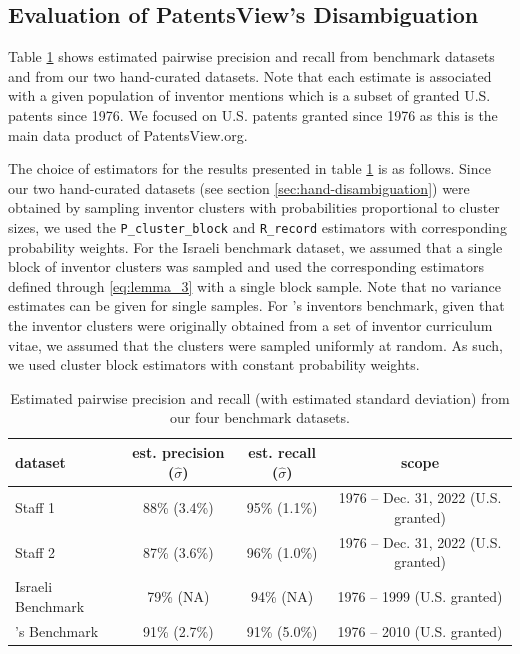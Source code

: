 \documentclass[fontsize=11pt]{article}
\theoremstyle{definition}
\begin{document}
\subsection{Evaluation of PatentsView's Disambiguation}

Table \ref{tab:results} shows estimated pairwise precision and recall from benchmark datasets and from our two hand-curated datasets. Note that each estimate is associated with a given population of inventor mentions which is a subset of granted U.S. patents since 1976. We focused on U.S. patents granted since 1976 as this is the main data product of PatentsView.org.

The choice of estimators for the results presented in table \ref{tab:results} is as follows.
Since our two hand-curated datasets (see section \ref{sec:hand-disambiguation}) were obtained by sampling inventor clusters with probabilities proportional to cluster sizes, we used the \texttt{P\_cluster\_block} and \texttt{R\_record} estimators with corresponding probability weights. 
For the Israeli benchmark dataset, we assumed that a single block of inventor clusters was sampled and used the corresponding estimators defined through \eqref{eq:lemma_3} with a single block sample. Note that no variance estimates can be given for single samples.
For \cite{Li2014}'s inventors benchmark, given that the inventor clusters were originally obtained from a set of inventor curriculum vitae, we assumed that the clusters were sampled uniformly at random. As such, we used cluster block estimators with constant probability weights.

\begin{table}[!h]
    \centering
    \caption{\centering Estimated pairwise precision and recall (with estimated standard deviation) from our four benchmark datasets.}
    \label{tab:results}
    \begin{tabular}{lccc}
    \toprule
    \textbf{dataset} & \textbf{est. precision ($\hat \sigma$)} & \textbf{est. recall ($\hat \sigma$)} & \textbf{scope} \\
    \midrule
    Staff 1 & 88\% (3.4\%) & 95\% (1.1\%)  & 1976 -- Dec. 31, 2022 (U.S. granted)\\
    Staff 2 & 87\% (3.6\%) & 96\% (1.0\%) & 1976 -- Dec. 31, 2022 (U.S. granted)\\
    Israeli Benchmark & 79\% (NA) & 94\% (NA) & 1976 -- 1999 (U.S. granted)\\
    \cite{Li2014}'s Benchmark & 91\% (2.7\%) & 91\% (5.0\%) & 1976 -- 2010 (U.S. granted)\\
    \bottomrule
    \end{tabular}
\end{table}
\end{document}
